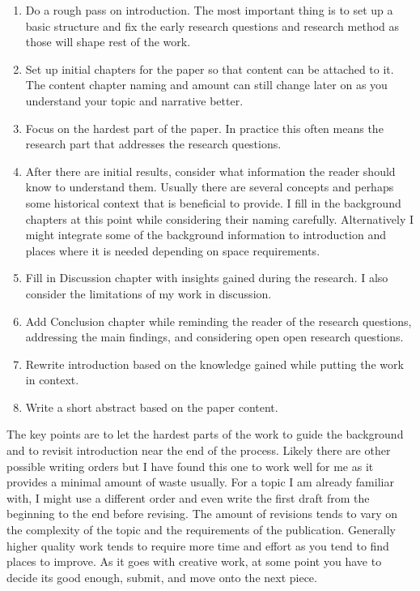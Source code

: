 \begin{enumerate}
    \item Do a rough pass on introduction. The most important thing is to set up a basic structure and fix the early research questions and research method as those will shape rest of the work.
    \item Set up initial chapters for the paper so that content can be attached to it. The content chapter naming and amount can still change later on as you understand your topic and narrative better.
    \item Focus on the hardest part of the paper. In practice this often means the research part that addresses the research questions.
    \item After there are initial results, consider what information the reader should know to understand them. Usually there are several concepts and perhaps some historical context that is beneficial to provide. I fill in the background chapters at this point while considering their naming carefully. Alternatively I might integrate some of the background information to introduction and places where it is needed depending on space requirements.
    \item Fill in Discussion chapter with insights gained during the research. I also consider the limitations of my work in discussion.
    \item Add Conclusion chapter while reminding the reader of the research questions, addressing the main findings, and considering open open research questions.
    \item Rewrite introduction based on the knowledge gained while putting the work in context.
    \item Write a short abstract based on the paper content.
\end{enumerate}

The key points are to let the hardest parts of the work to guide the background and to revisit introduction near the end of the process.
Likely there are other possible writing orders but I have found this one to work well for me as it provides a minimal amount of waste usually.
For a topic I am already familiar with, I might use a different order and even write the first draft from the beginning to the end before revising.
The amount of revisions tends to vary on the complexity of the topic and the requirements of the publication.
Generally higher quality work tends to require more time and effort as you tend to find places to improve.
As it goes with creative work, at some point you have to decide its good enough, submit, and move onto the next piece.

